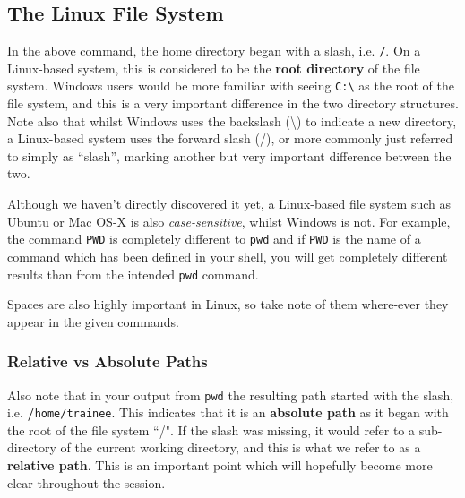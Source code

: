 \subsection{The Linux File System}
\begin{information}
In the above command, the home directory began with a slash, i.e. \texttt{/}.
On a Linux-based system, this is considered to be the \textbf{root directory} of the file system. 
Windows users would be more familiar with seeing \texttt{C:\textbackslash} as the root of the file system, and this is a very important difference in the two directory structures.
Note also that whilst Windows uses the backslash (\textbackslash) to indicate a new directory, a Linux-based system uses the forward slash (/), or more commonly just referred to simply as ``slash'', marking another but very important difference between the two. \\
\end{information}

\begin{warning}
Although we haven't directly discovered it yet, a Linux-based file system such as Ubuntu or Mac OS-X is also \textit{case-sensitive}, whilst Windows is not.
For example, the command \texttt{PWD} is completely different to \texttt{pwd} and if \texttt{PWD} is the name of a command which has been defined in your shell, you will get completely different results than from the intended \texttt{pwd} command.

Spaces are also highly important in Linux, so take note of them where-ever they appear in the given commands.
\end{warning}

\subsubsection*{Relative vs Absolute Paths}
\begin{information}
Also note that in your output from \texttt{pwd} the resulting path started with the slash, i.e. \textbf{/}\texttt{home/trainee}.
This indicates that it is an \textbf{absolute path} as it began with the root of the file system ``/".
If the slash was missing, it would refer to a sub-directory of the current working directory, and this is what we refer to as a \textbf{relative path}.
This is an important point which will hopefully become more clear throughout the session.
\end{information}


